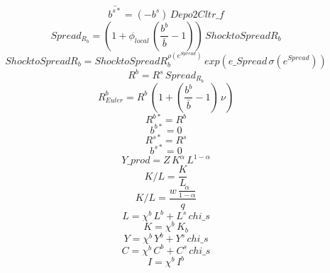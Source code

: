 \documentclass[10pt,a4paper]{article}
\begin{document}
\begin{dmath}
 \bar{b^{s*}} =\left(-b^s\right)\, Depo2Cltr\_f
\end{dmath}
\begin{dmath}
Spread_R_b=\left(1+\phi_{local}\, \left(\frac{b^b}{ \bar{b} }-1\right)\right)\, Shock to Spread R_b
\end{dmath}
\begin{dmath}
Shock to Spread R_b=Shock to Spread R_b^{\rho(e^{Spread}) }\, exp\left(e\_Spread\, \sigma(e^{Spread}) \right)
\end{dmath}
\begin{dmath}
R^b=R^s\, Spread_R_b
\end{dmath}
\begin{dmath}
 R^b_{Euler} =R^b\, \left(1+\left(\frac{b^b}{ \bar{b} }-1\right)\, \nu \right)
\end{dmath}
\begin{dmath}
R^{b*}=R^b
\end{dmath}
\begin{dmath}
b^{b*}=0
\end{dmath}
\begin{dmath}
R^{s*}=R^s
\end{dmath}
\begin{dmath}
b^{s*}=0
\end{dmath}
\begin{dmath}
Y\_prod=Z\, K^{\alpha }\, L^{1-\alpha }
\end{dmath}
\begin{dmath}
K/L=\frac{K}{L}
\end{dmath}
\begin{dmath}
K/L=\frac{w\, \frac{\alpha }{1-\alpha }}{q}
\end{dmath}
\begin{dmath}
L=\chi^b \, L^b+L^s\, chi\_s
\end{dmath}
\begin{dmath}
K=\chi^b \, K_b
\end{dmath}
\begin{dmath}
Y=\chi^b \, Y^b+Y^s\, chi\_s
\end{dmath}
\begin{dmath}
C=\chi^b \, C^b+C^s\, chi\_s
\end{dmath}
\begin{dmath}
I=\chi^b \, I^b
\end{dmath}
\end{document}
